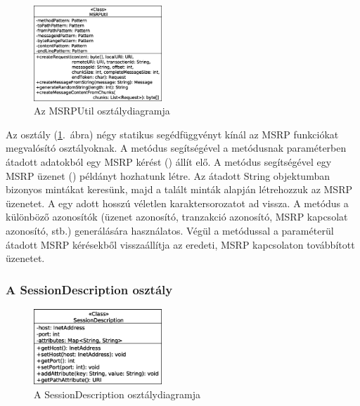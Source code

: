 \begin{figure}
  \vspace{-15pt}
  \begin{center}
    \includegraphics[width=0.43\textwidth]{img/class_diagrams/MSRPUtil.eps}
  \end{center}
  \vspace{-15pt}
  \captionsetup{font=scriptsize}
  \caption{Az MSRPUtil osztálydiagramja}
   \label{fig:class_util}
  \vspace{-10pt}
\end{figure}
Az  osztály (\ref{fig:class_util}.~ábra) négy statikus segédfüggvényt kínál az MSRP funkciókat megvalósító osztályoknak. A  metódus segítségével a metódusnak paraméterben átadott adatokból egy MSRP kérést () állít elő. A  metódus segítségével egy MSRP üzenet () példányt hozhatunk létre. Az átadott String objektumban bizonyos mintákat keresünk, majd a talált minták alapján létrehozzuk az MSRP üzenetet. A  egy adott hosszú véletlen karaktersorozatot ad vissza. A metódus a különböző azonosítók (üzenet azonosító, tranzakció azonosító, MSRP kapcsolat azonosító, stb.) generálására használatos. Végül a  metódussal a paraméterül átadott MSRP kérésekből visszaállítja az eredeti, MSRP kapcsolaton továbbított üzenetet.

\subsubsection*{A SessionDescription osztály}
\label{sec:msrp_sdp}

\begin{figure}
  \vspace{-15pt}
  \begin{center}
    \includegraphics[width=0.43\textwidth]{img/class_diagrams/SessionDescription.eps}
  \end{center}
  \vspace{-15pt}
  \captionsetup{font=scriptsize}
  \caption{A SessionDescription osztálydiagramja}
   \label{fig:class_sdp}
  \vspace{-10pt}
\end{figure}


